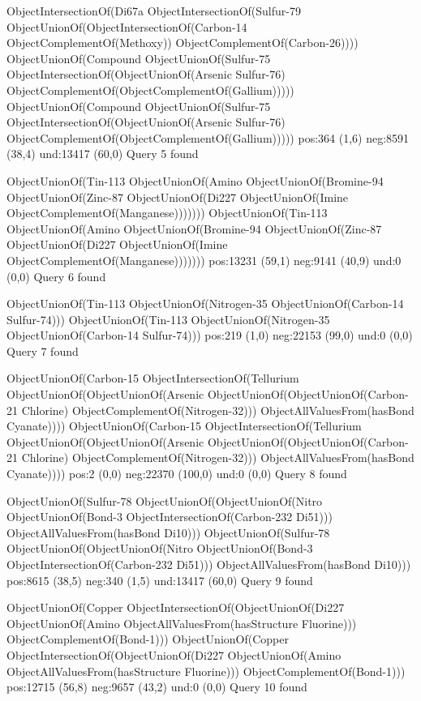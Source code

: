 ObjectIntersectionOf(Di67a ObjectIntersectionOf(Sulfur-79 ObjectUnionOf(ObjectIntersectionOf(Carbon-14 ObjectComplementOf(Methoxy)) ObjectComplementOf(Carbon-26))))
ObjectUnionOf(Compound ObjectUnionOf(Sulfur-75 ObjectIntersectionOf(ObjectUnionOf(Arsenic Sulfur-76) ObjectComplementOf(ObjectComplementOf(Gallium)))))
ObjectUnionOf(Compound ObjectUnionOf(Sulfur-75 ObjectIntersectionOf(ObjectUnionOf(Arsenic Sulfur-76) ObjectComplementOf(ObjectComplementOf(Gallium)))))
pos:364 (1,6)		 neg:8591 (38,4)	 und:13417 (60,0)
Query 5 found

ObjectUnionOf(Tin-113 ObjectUnionOf(Amino ObjectUnionOf(Bromine-94 ObjectUnionOf(Zinc-87 ObjectUnionOf(Di227 ObjectUnionOf(Imine ObjectComplementOf(Manganese)))))))
ObjectUnionOf(Tin-113 ObjectUnionOf(Amino ObjectUnionOf(Bromine-94 ObjectUnionOf(Zinc-87 ObjectUnionOf(Di227 ObjectUnionOf(Imine ObjectComplementOf(Manganese)))))))
pos:13231 (59,1)		 neg:9141 (40,9)		 und:0 (0,0)
Query 6 found

ObjectUnionOf(Tin-113 ObjectUnionOf(Nitrogen-35 ObjectUnionOf(Carbon-14 Sulfur-74)))
ObjectUnionOf(Tin-113 ObjectUnionOf(Nitrogen-35 ObjectUnionOf(Carbon-14 Sulfur-74)))
pos:219 (1,0)		 neg:22153 (99,0)		 und:0 (0,0)
Query 7 found

ObjectUnionOf(Carbon-15 ObjectIntersectionOf(Tellurium ObjectUnionOf(ObjectUnionOf(Arsenic ObjectUnionOf(ObjectUnionOf(Carbon-21 Chlorine) ObjectComplementOf(Nitrogen-32))) ObjectAllValuesFrom(hasBond Cyanate))))
ObjectUnionOf(Carbon-15 ObjectIntersectionOf(Tellurium ObjectUnionOf(ObjectUnionOf(Arsenic ObjectUnionOf(ObjectUnionOf(Carbon-21 Chlorine) ObjectComplementOf(Nitrogen-32))) ObjectAllValuesFrom(hasBond Cyanate))))
pos:2 (0,0)		 neg:22370 (100,0)		 und:0 (0,0)
Query 8 found

ObjectUnionOf(Sulfur-78 ObjectUnionOf(ObjectUnionOf(Nitro ObjectUnionOf(Bond-3 ObjectIntersectionOf(Carbon-232 Di51))) ObjectAllValuesFrom(hasBond Di10)))
ObjectUnionOf(Sulfur-78 ObjectUnionOf(ObjectUnionOf(Nitro ObjectUnionOf(Bond-3 ObjectIntersectionOf(Carbon-232 Di51))) ObjectAllValuesFrom(hasBond Di10)))
pos:8615 (38,5)		 neg:340 (1,5)		 und:13417 (60,0)
Query 9 found

ObjectUnionOf(Copper ObjectIntersectionOf(ObjectUnionOf(Di227 ObjectUnionOf(Amino ObjectAllValuesFrom(hasStructure Fluorine))) ObjectComplementOf(Bond-1)))
ObjectUnionOf(Copper ObjectIntersectionOf(ObjectUnionOf(Di227 ObjectUnionOf(Amino ObjectAllValuesFrom(hasStructure Fluorine))) ObjectComplementOf(Bond-1)))
pos:12715 (56,8)		 neg:9657 (43,2)		 und:0 (0,0)
Query 10 found

